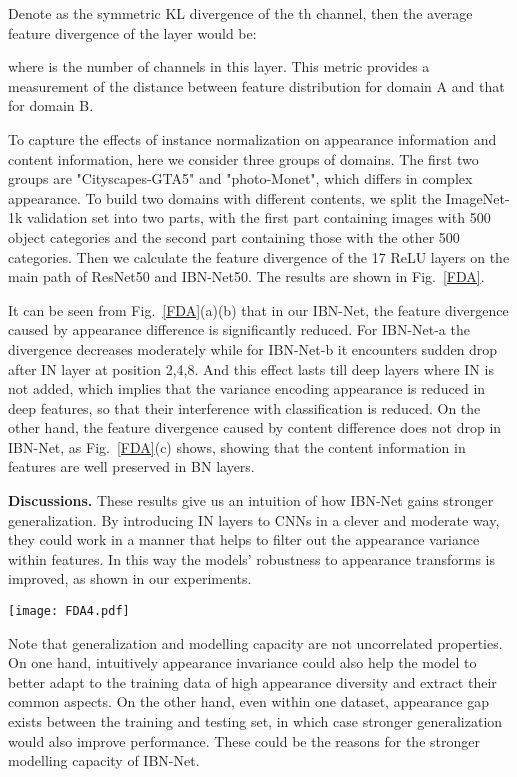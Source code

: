 \documentclass[runningheads]{llncs}
\begin{document}
Denote  as the symmetric KL divergence of the th channel, then the average feature divergence of the layer would be:

where  is the number of channels in this layer. This metric provides a measurement of the distance between feature distribution for domain A and that for domain B.


To capture the effects of instance normalization on appearance information and content information, here we consider three groups of domains.
The first two groups are "Cityscapes-GTA5" and "photo-Monet", which differs in complex appearance.
To build two domains with different contents, we split the ImageNet-1k validation set into two parts, with the first part containing images with 500 object categories and the second part containing those with the other 500 categories.
Then we calculate the feature divergence of the 17 ReLU layers on the main path of ResNet50 and IBN-Net50.
The results are shown in Fig.~\ref{FDA}.

It can be seen from Fig.~\ref{FDA}(a)(b) that in our IBN-Net, the feature divergence caused by appearance difference is significantly reduced.
For IBN-Net-a the divergence decreases moderately while for IBN-Net-b it encounters sudden drop after IN layer at position 2,4,8.
And this effect lasts till deep layers where IN is not added, which implies that the variance encoding appearance is reduced in deep features, so that their interference with classification is reduced.
On the other hand, the feature divergence caused by content difference does not drop in IBN-Net, as Fig.~\ref{FDA}(c) shows,
showing that the content information in features are well preserved in BN layers.

\textbf{Discussions.} These results give us an intuition of how IBN-Net gains stronger generalization.
By introducing IN layers to CNNs in a clever and moderate way, they could work in a manner that helps to filter out the appearance variance within features.
In this way the models' robustness to appearance transforms is improved, as shown in our experiments.


\begin{figure*}[!t]
\centering
\texttt{[image: FDA4.pdf]}
\caption{\label{FDA} Feature divergence caused by (a) real-virtual appearance gap, (b) style gap, (c) object class difference. }
\end{figure*}

Note that generalization and modelling capacity are not uncorrelated properties.
On one hand, intuitively appearance invariance could also help the model to better adapt to the training data of high appearance diversity and extract their common aspects.
On the other hand, even within one dataset, appearance gap exists between the training and testing set, in which case stronger generalization would also improve performance.
These could be the reasons for the stronger modelling capacity of IBN-Net.
\end{document}
